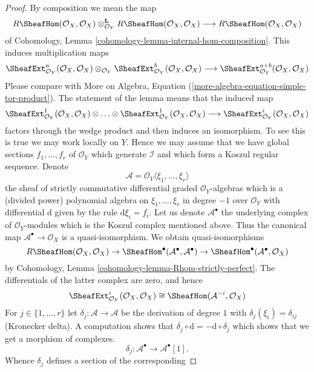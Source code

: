 \begin{proof}
By composition we mean the map
$$
R\SheafHom(\mathcal{O}_X, \mathcal{O}_X)
\otimes_{\mathcal{O}_Y}^\mathbf{L}
R\SheafHom(\mathcal{O}_X, \mathcal{O}_X)
\longrightarrow
R\SheafHom(\mathcal{O}_X, \mathcal{O}_X)
$$
of Cohomology, Lemma \ref{cohomology-lemma-internal-hom-composition}.
This induces multiplication maps
$$
\SheafExt^a_{\mathcal{O}_Y}(\mathcal{O}_X, \mathcal{O}_X)
\otimes_{\mathcal{O}_Y}
\SheafExt^b_{\mathcal{O}_Y}(\mathcal{O}_X, \mathcal{O}_X)
\longrightarrow
\SheafExt^{a + b}_{\mathcal{O}_Y}(\mathcal{O}_X, \mathcal{O}_X)
$$
Please compare with
More on Algebra, Equation (\ref{more-algebra-equation-simple-tor-product}).
The statement of the lemma means that the induced map
$$
\SheafExt^1_{\mathcal{O}_Y}(\mathcal{O}_X, \mathcal{O}_X)
\otimes \ldots \otimes
\SheafExt^1_{\mathcal{O}_Y}(\mathcal{O}_X, \mathcal{O}_X)
\longrightarrow
\SheafExt^i_{\mathcal{O}_Y}(\mathcal{O}_X, \mathcal{O}_X)
$$
factors through the wedge product and then induces an isomorphism.
To see this is true we may work locally on $Y$. Hence we may assume
that we have global sections $f_1, \ldots, f_r$ of $\mathcal{O}_Y$
which generate $\mathcal{I}$ and which form a Koszul regular sequence.
Denote
$$
\mathcal{A} = \mathcal{O}_Y\langle \xi_1, \ldots, \xi_r\rangle
$$
the sheaf of strictly commutative differential graded $\mathcal{O}_Y$-algebras
which is a (divided power) polynomial algebra on
$\xi_1, \ldots, \xi_r$ in degree $-1$ over $\mathcal{O}_Y$
with differential $\text{d}$ given by the rule $\text{d}\xi_i = f_i$.
Let us denote $\mathcal{A}^\bullet$ the underlying
complex of $\mathcal{O}_Y$-modules which is the Koszul complex
mentioned above. Thus the canonical map
$\mathcal{A}^\bullet \to \mathcal{O}_X$
is a quasi-isomorphism. We obtain quasi-isomorphisms
$$
R\SheafHom(\mathcal{O}_X, \mathcal{O}_X) \to
\SheafHom^\bullet(\mathcal{A}^\bullet, \mathcal{A}^\bullet) \to
\SheafHom^\bullet(\mathcal{A}^\bullet, \mathcal{O}_X)
$$
by Cohomology, Lemma \ref{cohomology-lemma-Rhom-strictly-perfect}.
The differentials of the latter complex are zero, and hence
$$
\SheafExt^i_{\mathcal{O}_Y}(\mathcal{O}_X, \mathcal{O}_X)
\cong \SheafHom(\mathcal{A}^{-i}, \mathcal{O}_X)
$$
For $j \in \{1, \ldots, r\}$ let $\delta_j : \mathcal{A} \to \mathcal{A}$
be the derivation of degree $1$ with $\delta_j(\xi_i) = \delta_{ij}$
(Kronecker delta). A computation shows that
$\delta_j \circ \text{d} = - \text{d} \circ \delta_j$ which shows that
we get a morphism of complexes.
$$
\delta_j : \mathcal{A}^\bullet \to \mathcal{A}^\bullet[1].
$$
Whence $\delta_j$ defines a section of the corresponding

\end{proof}
